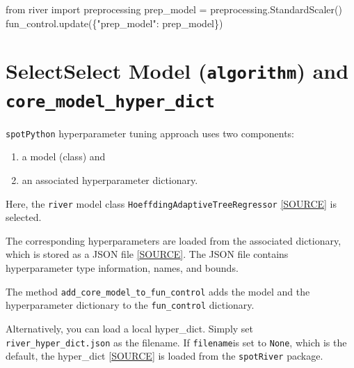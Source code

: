 \documentclass[
  letterpaper,
  DIV=11,
  numbers=noendperiod]{scrreprt}
\newenvironment{Shaded}{\begin{snugshade}}{\end{snugshade}}
\newcommand{\ImportTok}[1]{\textcolor[rgb]{0.00,0.46,0.62}{#1}}
\newcommand{\NormalTok}[1]{\textcolor[rgb]{0.00,0.23,0.31}{#1}}
\newcommand{\OperatorTok}[1]{\textcolor[rgb]{0.37,0.37,0.37}{#1}}
\newcommand{\StringTok}[1]{\textcolor[rgb]{0.13,0.47,0.30}{#1}}
\providecommand{\tightlist}{%
  \setlength{\itemsep}{0pt}\setlength{\parskip}{0pt}}\usepackage{longtable,booktabs,array}
\begin{document}
\begin{Shaded}
\begin{Highlighting}[]
\ImportTok{from}\NormalTok{ river }\ImportTok{import}\NormalTok{ preprocessing}
\NormalTok{prep\_model }\OperatorTok{=}\NormalTok{ preprocessing.StandardScaler()}
\NormalTok{fun\_control.update(\{}\StringTok{"prep\_model"}\NormalTok{: prep\_model\})}
\end{Highlighting}
\end{Shaded}

\hypertarget{selectselect-model-algorithm-and-core_model_hyper_dict}{%
\section{\texorpdfstring{SelectSelect Model (\texttt{algorithm}) and
\texttt{core\_model\_hyper\_dict}}{SelectSelect Model (algorithm) and core\_model\_hyper\_dict}}\label{selectselect-model-algorithm-and-core_model_hyper_dict}}

\texttt{spotPython} hyperparameter tuning approach uses two components:

\begin{enumerate}
\def\labelenumi{\arabic{enumi}.}
\tightlist
\item
  a model (class) and
\item
  an associated hyperparameter dictionary.
\end{enumerate}

Here, the \texttt{river} model class
\texttt{HoeffdingAdaptiveTreeRegressor}
\href{https://riverml.xyz/dev/api/tree/HoeffdingAdaptiveTreeRegressor/}{{[}SOURCE{]}}
is selected.

The corresponding hyperparameters are loaded from the associated
dictionary, which is stored as a JSON file
\href{https://github.com/sequential-parameter-optimization/spotRiver/blob/main/src/spotRiver/data/river_hyper_dict.json}{{[}SOURCE{]}}.
The JSON file contains hyperparameter type information, names, and
bounds.

The method \texttt{add\_core\_model\_to\_fun\_control} adds the model
and the hyperparameter dictionary to the \texttt{fun\_control}
dictionary.

Alternatively, you can load a local hyper\_dict. Simply set
\texttt{river\_hyper\_dict.json} as the filename. If \texttt{filename}is
set to \texttt{None}, which is the default, the hyper\_dict
\href{https://github.com/sequential-parameter-optimization/spotRiver/blob/main/src/spotRiver/data/river_hyper_dict.json}{{[}SOURCE{]}}
is loaded from the \texttt{spotRiver} package.
\end{document}
